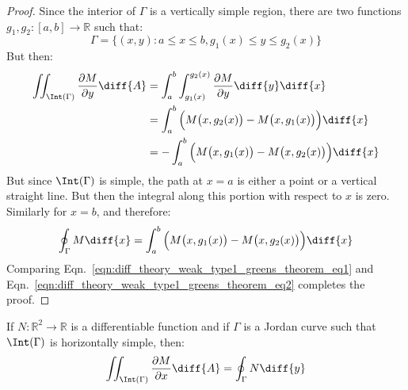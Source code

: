 \documentclass[crop=false,class=book,oneside]{standalone}
\begin{document}
            \begin{proof}
                Since the interior of $\Gamma$ is a vertically simple region, there are
                two functions $g_{1},g_{2}:[a,b]\rightarrow\mathbb{R}$ such that:
                \begin{equation}
                    \Gamma=
                    \{(x,y):a\leq{x}\leq{b},g_{1}(x)\leq{y}\leq{g}_{2}(x)\}
                \end{equation}
                But then:
                \begin{subequations}
                    \begin{align}
                        \iint_{\Int(\Gamma)}
                            \frac{\partial{M}}{\partial{y}}\diff{A}
                        &=\int_{a}^{b}\int_{g_{1}(x)}^{g_{2}(x)}
                            \frac{\partial{M}}{\partial{y}}\diff{y}\diff{x}\\
                        &=\int_{a}^{b}
                            \Big(M\big(x,g_{2}(x)\big)
                            -M\big(x,g_{1}(x)\big)\Big)\diff{x}\\
                        \label{eqn:diff_theory_weak_type1_greens_theorem_eq1}
                        &=-\int_{a}^{b}
                            \Big(M\big(x,g_{1}(x)\big)
                            -M\big(x,g_{2}(x)\big)\Big)\diff{x}
                    \end{align}
                \end{subequations}
                But since $\Int(\Gamma)$ is simple, the path at
                $x=a$ is either a point or a vertical
                straight line. But then the integral along this
                portion with respect to $x$ is zero. Similarly for
                $x=b$, and therefore:
                \begin{equation}
                    \label{eqn:diff_theory_weak_type1_greens_theorem_eq2}
                    \oint_{\Gamma}M\diff{x}=
                    \int_{a}^{b}
                            \Big(M\big(x,g_{1}(x)\big)
                            -M\big(x,g_{2}(x)\big)\Big)\diff{x}
                \end{equation}
                Comparing Eqn.~\ref{eqn:diff_theory_weak_type1_greens_theorem_eq1}
                and Eqn.~\ref{eqn:diff_theory_weak_type1_greens_theorem_eq2}
                completes the proof.
            \end{proof}
            \begin{theorem}
                \label{thm:Diff_Theory_Greens_Theorem_Simple_t2_region}
                If $N:\mathbb{R}^{2}\rightarrow\mathbb{R}$ is a differentiable
                function and if $\Gamma$ is a Jordan curve such that
                $\Int(\Gamma)$ is horizontally simple, then:
                \begin{equation}
                    \iint_{\Int(\Gamma)}
                        \frac{\partial{M}}{\partial{x}}\diff{A}
                    =\oint_{\Gamma}N\diff{y}
                \end{equation}
            \end{theorem}
\end{document}
